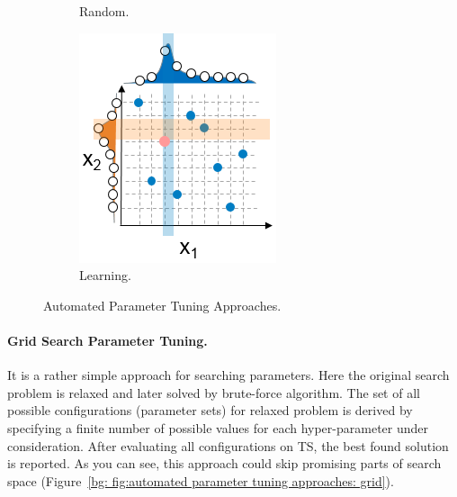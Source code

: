 \begin{figure}
\begin{subfigure}[b]{0.25\linewidth}
		\caption{Random.}
		\label{bg: fig:automated parameter tuning approaches: random}
	\end{subfigure}
	\begin{subfigure}[b]{0.25\linewidth}
		\includegraphics[width=\linewidth]{graphics/Background/hyperparameter-learning-search.png}
		\caption{Learning.}
		\label{bg: fig:automated parameter tuning approaches: learning}
	\end{subfigure}
	\caption{Automated Parameter Tuning Approaches.}
	\label{bg: fig:automated parameter tuning approaches}
\end{figure}

\paragraph{Grid Search Parameter Tuning.} It is a rather simple approach for searching parameters. Here the original search problem is relaxed and later solved by brute-force algorithm. The set of all possible configurations (parameter sets) for relaxed problem is derived by specifying a finite number of possible values for each hyper-parameter under consideration. After evaluating all configurations on TS, the best found solution is reported. As you can see, this approach could skip promising parts of search space (Figure~\ref{bg: fig:automated parameter tuning approaches: grid}).

